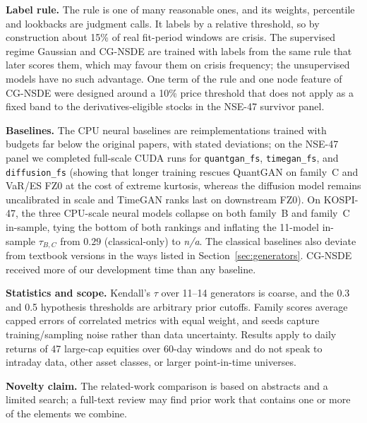 \documentclass[journal]{IEEEtran}
\newcommand{\pendingnum}{\textit{n/a}}
\providecommand{\tauBCkrFullPrereg}{\pendingnum}
\begin{document}
\textbf{Label rule.} The rule is one of many reasonable ones, and its weights, percentile and lookbacks are
judgment calls. It labels by a relative threshold, so by construction about 15\% of real fit-period windows are
crisis. The supervised regime Gaussian and CG-NSDE are trained with labels from the same rule that later
scores them, which may favour them on crisis frequency; the unsupervised models have no such advantage. One
term of the rule and one node feature of CG-NSDE were designed around a 10\% price threshold that does not
apply as a fixed band to the derivatives-eligible stocks in the NSE-47 survivor panel.

\textbf{Baselines.} The CPU neural baselines are reimplementations trained with budgets far below the
original papers, with stated deviations; on the NSE-47 panel we completed full-scale CUDA runs for
\texttt{quantgan\_fs}, \texttt{timegan\_fs}, and \texttt{diffusion\_fs} (showing that longer training rescues QuantGAN on family~C and
VaR/ES FZ0 at the cost of extreme kurtosis, whereas the diffusion model remains uncalibrated in scale and TimeGAN ranks last on downstream FZ0). On KOSPI-47,
the three CPU-scale neural models collapse on both family~B and family~C in-sample, tying the bottom of both
rankings and inflating the 11-model in-sample $\tau_{B,C}$ from $0.29$ (classical-only) to \tauBCkrFullPrereg.
The classical baselines also deviate from textbook versions in the ways listed in Section~\ref{sec:generators}.
CG-NSDE received more of our development time than any baseline.

\textbf{Statistics and scope.} Kendall's $\tau$ over 11--14 generators is coarse, and the 0.3 and 0.5
hypothesis thresholds are arbitrary prior cutoffs. Family scores average capped errors of correlated metrics
with equal weight, and seeds capture training/sampling noise rather than data uncertainty. Results apply to
daily returns of 47 large-cap equities over 60-day windows and do not speak to intraday data, other asset
classes, or larger point-in-time universes.

\textbf{Novelty claim.} The related-work comparison is based on abstracts and a limited search; a full-text
review may find prior work that contains one or more of the elements we combine.

\end{document}
